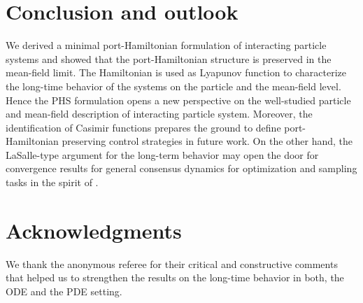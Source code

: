 \documentclass[11pt]{article}
\begin{document}
\begin{bibunit}[abbrv]
\section{Conclusion and outlook}
We derived a minimal port-Hamiltonian formulation of interacting particle systems and  showed that the port-Hamiltonian structure is preserved in the mean-field limit. The Hamiltonian is used as Lyapunov function to characterize the long-time behavior of the systems on the particle and the mean-field level. Hence the PHS formulation opens a new perspective on the well-studied particle and mean-field description of interacting particle system. Moreover, the identification of Casimir functions prepares the ground to define port-Hamiltonian  preserving control strategies in future work. On the other hand, the LaSalle-type argument for the long-term behavior may open the door for convergence results for general consensus dynamics for optimization and sampling tasks in the spirit of \cite{carrillo2022consensus,totzeck2022trends}.


\section*{Acknowledgments} We thank the anonymous referee for their critical and constructive comments that helped us to strengthen the results on the long-time behavior in both, the ODE and the PDE setting.
        
        \putbib[interparticle]
    \end{bibunit}
\end{document}
